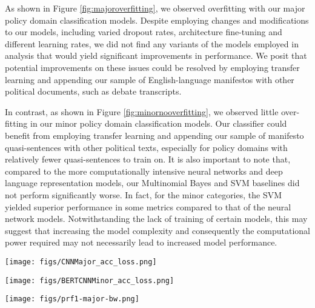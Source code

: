 \documentclass[11pt]{article}
\begin{document}
As shown in Figure \ref{fig:majoroverfitting}, we observed overfitting with our major policy domain classification models. Despite employing changes and modifications to our models, including varied dropout rates, architecture fine-tuning and different learning rates, we did not find any variants of the models employed in analysis that would yield significant improvements in performance. We posit that potential improvements on these issues could be resolved by employing transfer learning and appending our sample of English-language manifestos with other political documents, such as debate transcripts.

In contrast, as shown in Figure \ref{fig:minornooverfitting}, we observed little over-fitting in our minor policy domain classification models. Our classifier could benefit from employing transfer learning and appending our sample of manifesto quasi-sentences with other political texts, especially for policy domains with relatively fewer quasi-sentences to train on. It is also important to note that, compared to the more computationally intensive neural networks and deep language representation models, our Multinomial Bayes and SVM baselines did not perform significantly worse. In fact, for the minor categories, the SVM yielded superior performance in some metrics compared to that of the neural network models. Notwithstanding the lack of training of certain models, this may suggest that increasing the model complexity and consequently the computational power required may not necessarily lead to increased model performance.

\begin{figure*}[th!]
  \centering
  \texttt{[image: figs/CNNMajor\_acc\_loss.png]}
  \caption{An illustration of overfitting in our CNN model for classifying manifesto quasi-sentences by major policy domain}
  \label{fig:majoroverfitting}
\end{figure*}

\begin{figure*}[h!]
  \centering
  \texttt{[image: figs/BERTCNNMinor\_acc\_loss.png]}
  \caption{Training and validation metrics for the BERT-CNN model on English language manifestos on minor policy domains}
  \label{fig:minornooverfitting}
\end{figure*}
%

\begin{figure*}[h!]
  \centering
  \texttt{[image: figs/prf1-major-bw.png]}
  \caption{Average precision, recall, and Macro-F1 scores by major category across all models}
  \label{fig:prf1major}
\end{figure*}
\end{document}
